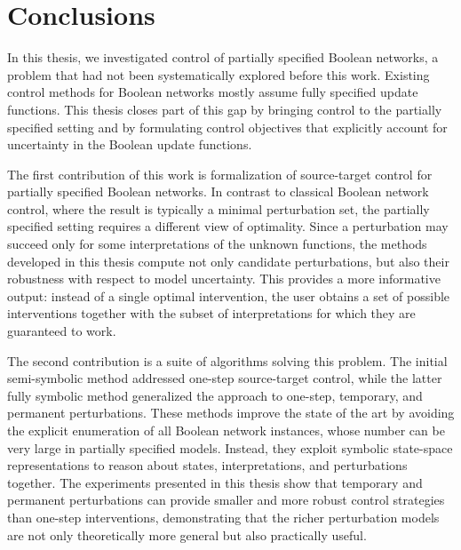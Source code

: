 

\cleardoublepage


\chapter*{Conclusions}
{}
\makeatletter
\def\@currentlabelname{Conclusions}
\makeatother
\label{chapter:conclusion}

In this thesis, we investigated control of partially specified Boolean
networks, a problem that had not been systematically explored before this
work. Existing control methods for Boolean networks mostly assume fully
specified update functions. This thesis closes part of this gap by
bringing control to the partially specified setting and by formulating control
objectives that explicitly account for uncertainty in the Boolean update
functions.

The first contribution of this work is formalization of source-target control
for partially specified Boolean networks. In contrast to classical Boolean
network control, where the result is typically a minimal perturbation set, the
partially specified setting requires a different view of optimality. Since a
perturbation may succeed only for some interpretations of the unknown
functions, the methods developed in this thesis compute not only candidate
perturbations, but also their robustness with respect to model uncertainty.
This provides a more informative output: instead of a single optimal
intervention, the user obtains a set of possible interventions together with
the subset of interpretations for which they are guaranteed to
work.

The second contribution is a suite of algorithms solving this problem.
The initial semi-symbolic method addressed one-step source-target control,
while the latter fully symbolic method generalized the approach to one-step,
temporary, and permanent perturbations. These methods improve the state
of the art by avoiding the explicit enumeration of all Boolean network
instances, whose number can be very large in partially specified models.
Instead, they exploit symbolic state-space representations to reason about
states, interpretations, and perturbations together. The experiments presented in this thesis
show that temporary and permanent perturbations can provide smaller and
more robust control strategies than one-step interventions, demonstrating
that the richer perturbation models are not only theoretically more general
but also practically useful.

